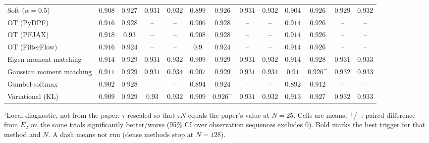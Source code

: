 \begin{table}[ht]
\begin{adjustbox}{max width=\linewidth}
\begin{tabular}{lcccc|cccc|cccc}
Soft ($\alpha{=}0.5$) & $\mathbf{0.908}$ & $\mathbf{0.927}$ & $0.931$ & $\mathbf{0.932}$ & $0.899$ & $0.926$ & $\mathbf{0.931}$ & $0.932$ & $0.904$ & $0.926$ & $0.929$ & $0.932$ \\
OT (PyDPF) & $\mathbf{0.916}$ & $\mathbf{0.928}$ & -- & -- & $0.906$ & $\mathbf{0.928}$ & -- & -- & $0.914$ & $0.926$ & -- & -- \\
OT (PFJAX) & $\mathbf{0.918}$ & $\mathbf{0.93}$ & -- & -- & $0.908$ & $0.928$ & -- & -- & $0.914$ & $0.926$ & -- & -- \\
OT (FilterFlow) & $\mathbf{0.916}$ & $0.924$ & -- & -- & $0.9$ & $0.924$ & -- & -- & $0.914$ & $\mathbf{0.926}$ & -- & -- \\
Eigen moment matching & $\mathbf{0.914}$ & $\mathbf{0.929}$ & $0.931$ & $0.932$ & $0.909$ & $\mathbf{0.929}$ & $0.931$ & $0.932$ & $0.914$ & $0.928$ & $\mathbf{0.931}$ & $\mathbf{0.933}$ \\
Gaussian moment matching & $\mathbf{0.911}$ & $\mathbf{0.929}$ & $0.931$ & $\mathbf{0.934}$ & $0.907$ & $0.929$ & $0.931$ & $0.934$ & $0.91$ & $0.926^{-}$ & $\mathbf{0.932}$ & $0.933$ \\
Gumbel-softmax & $\mathbf{0.902}$ & $\mathbf{0.928}$ & -- & -- & $0.894$ & $0.924$ & -- & -- & $0.892$ & $0.912$ & -- & -- \\
Variational (KL) & $0.909$ & $\mathbf{0.929}$ & $0.93$ & $0.932$ & $0.909$ & $0.926^{-}$ & $0.931$ & $0.932$ & $\mathbf{0.913}$ & $0.927$ & $\mathbf{0.932}$ & $\mathbf{0.933}$ \\
\bottomrule
\end{tabular}
\end{adjustbox}
\par\smallskip\parbox{0.95\linewidth}{\footnotesize $^\dagger$Local diagnostic, not from the paper: $\tau$ rescaled so that $\tau N$ equals the paper's value at $N{=}25$. Cells are means; $^{+}$/$^{-}$: paired difference from $E_2$ on the same trials significantly better/worse (95\% CI over observation sequences excludes 0). Bold marks the best trigger for that method and $N$. A dash means not run (dense methods stop at $N{=}128$).}
\end{table}

